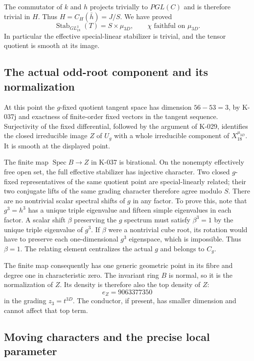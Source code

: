 The commutator of $k$ and $h$ projects trivially to
$PGL(C)$ and is therefore trivial in $H$. Thus
$H=C_H(\bar h)=J/S$. We have proved
\[
        \operatorname{Stab}_{GL_{18}^3}(T)
                  =S\times\mu_{3D},
          \qquad\chi\text{ faithful on }\mu_{3D}.        \tag{K-038d}
\]
In particular the effective special-linear stabilizer is
trivial, and the tensor quotient is smooth at its image.

\subsection*{The actual odd-root component and its normalization}

At this point the $g$-fixed quotient tangent space has
dimension $56-53=3$, by K-037j and exactness of finite-order
fixed vectors in the tangent sequence. Surjectivity of
the fixed differential, followed by the argument of
K-029, identifies the closed irreducible image $Z$ of
$U_g$ with a whole irreducible component of
$X_{18}^{\mu_{3D}}$. It is smooth at the displayed point.

The finite map $\operatorname{Spec}B\to Z$ in K-037 is
birational. On the nonempty effectively free open set,
the full effective stabilizer has injective character.
Two closed $g$-fixed representatives of the same quotient
point are special-linearly related; their two conjugate
lifts of the same grading character therefore agree
modulo $S$. There are no nontrivial scalar spectral
shifts of $g$ in any factor. To prove this, note that
$g^3=h^3$ has a unique triple eigenvalue and fifteen
simple eigenvalues in each factor. A scalar shift
$\beta$ preserving the $g$ spectrum must satisfy
$\beta^3=1$ by the unique triple eigenvalue of $g^3$.
If $\beta$ were a nontrivial cube root, its rotation
would have to preserve each one-dimensional $g^3$
eigenspace, which is impossible. Thus $\beta=1$.
The relating element centralizes the actual $g$ and
belongs to $C_g$.

The finite map consequently has one generic geometric
point in its fibre and degree one in characteristic zero.
The invariant ring $B$ is normal, so it is the
normalization of $Z$. Its density is therefore also
the top density of $Z$:
\[
                            e_Z=9063377350               \tag{K-038e}
\]
in the grading $z_3=t^{3D}$. The conductor, if present,
has smaller dimension and cannot affect that top term.

\subsection*{Moving characters and the precise local parameter}

